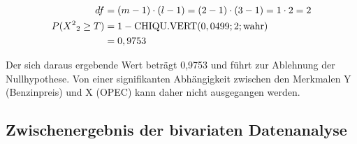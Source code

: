 \begin{align}
  df &= (m-1) \cdot (l-1) = (2-1) \cdot (3-1) = 1 \cdot 2 = 2\\
  P({X^2}_2 \geq T) &= 1 - \text{CHIQU.VERT}(0,0499; 2; \text{wahr})\\
                    &= 0,9753
\end{align}

Der sich daraus ergebende Wert beträgt 0,9753 und führt zur Ablehnung der Nullhypothese. Von einer signifikanten Abhängigkeit zwischen den Merkmalen Y (Benzinpreis) und X (OPEC) kann daher nicht ausgegangen werden.



\subsection{Zwischenergebnis der bivariaten Datenanalyse}
